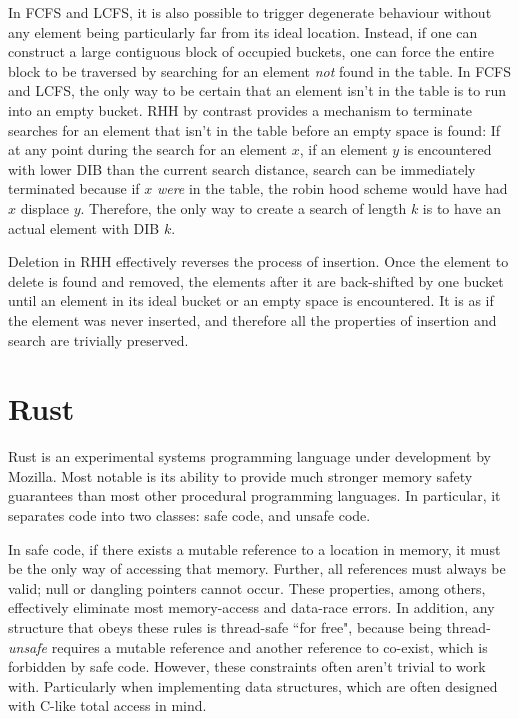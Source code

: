 \documentclass{cccg13}
\begin{document}
In FCFS and LCFS, it is also possible to trigger degenerate behaviour without
any element being particularly far from its ideal location. Instead, if one
can construct a large contiguous block of occupied buckets, one can force the
entire block to be traversed by searching for an element \emph{not} found in
the table. In FCFS and LCFS, the only way to be certain that an element isn't
in the table is to run into an empty bucket. RHH by contrast provides a
mechanism to terminate searches for an element that isn't in the table before
an empty space is found: If at any point during the search for an element $x$,
if an element $y$ is encountered with lower DIB than the current search
distance, search can be immediately terminated because if $x$ \emph{were} in
the table, the robin hood scheme would have had $x$ displace $y$. Therefore,
the only way to create a search of length $k$ is to have an actual element
with DIB $k$.

Deletion in RHH effectively reverses the process of insertion. Once the
element to delete is found and removed, the elements after it are back-shifted
by one bucket until an element in its ideal bucket or an empty space is
encountered. It is as if the element was never inserted, and therefore all the
properties of insertion and search are trivially preserved.





\section{Rust}

Rust is an experimental systems programming language under development by
Mozilla. Most notable is its ability to provide much stronger memory safety
guarantees than most other procedural programming languages. In particular, it
separates code into two classes: safe code, and unsafe code.

In safe code, if there exists a mutable reference to a location in memory, it
must be the only way of accessing that memory. Further, all references must
always be valid; null or dangling pointers cannot occur. These properties,
among others, effectively eliminate most memory-access and data-race errors.
In addition, any structure that obeys these rules is thread-safe ``for free",
because being thread-\emph{unsafe} requires a mutable reference and another
reference to co-exist, which is forbidden by safe code. However, these
constraints often aren't trivial to work with. Particularly when implementing
data structures, which are often designed with C-like total access in mind.
\end{document}
